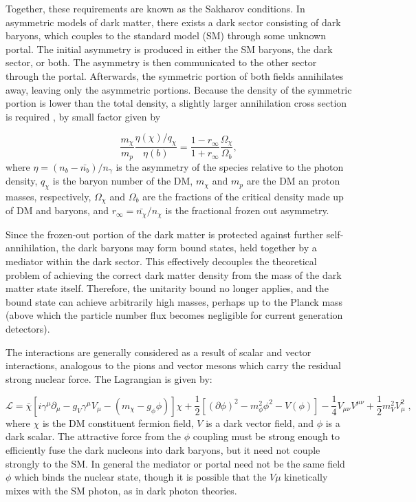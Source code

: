 Together, these requirements are known as the Sakharov conditions\cite{sakharov_violation_1967}. 
In asymmetric models of dark matter, there exists a dark sector consisting of dark baryons, which couples to the standard model (SM) through some unknown portal.
The initial asymmetry is produced in either the SM baryons, the dark sector, or both.
The asymmetry is then communicated to the other sector through the portal.
Afterwards, the symmetric portion of both fields annihilates away, leaving only the asymmetric portions.
Because the density of the symmetric portion is lower than the total density, a slightly larger annihilation cross section is required \cite{petraki_review_2013}, by small factor given by

\begin{equation}
    \frac{m_{\chi}}{m_p} \frac{\eta(\chi)/q_\chi}{\eta(b)} = \frac{1-r_\infty}{1+r_\infty}\frac{\Omega_\chi}{\Omega_b},
\end{equation}
\noindent
 where $\eta = (n_b -\bar{n_b})/n_\gamma$ is the asymmetry of the species relative to the photon density, $q_\chi$ is the baryon number of the DM, $m_\chi$ and $m_p$ are the DM an proton masses, respectively, $\Omega_\chi$ and $\Omega_b$ are the fractions of the critical density made up of DM and baryons, and $r_\infty = \bar{n_\chi} / n_\chi$ is the fractional frozen out asymmetry. 

Since the frozen-out portion of the dark matter is protected against further self-annihilation, the dark baryons may form bound states, held together by a mediator within the dark sector.
This effectively decouples the theoretical problem of achieving the correct dark matter density from the mass of the dark matter state itself.
Therefore, the unitarity bound no longer applies, and the bound state can achieve arbitrarily high masses, perhaps up to the Planck mass (above which the particle number flux becomes negligible for current generation detectors).

The interactions are generally considered as a result of scalar and vector interactions, analogous to  the pions and vector mesons which carry the residual strong nuclear force.
The Lagrangian is given by\cite{gresham_nuclear_2017}:

\begin{equation}
    \mathcal{L} = \bar \chi [i \gamma^\mu \partial_\mu - g_V \gamma^\mu V_\mu - (m_\chi - g_\phi \phi)] \chi + \frac{1}{2}[(\partial \phi )^2 - m_\phi^2 \phi^2 - V(\phi)] - \frac{1}{4} V_{\mu \nu} V^{\mu \nu} + \frac{1}{2} m_V^2 V_\mu^2\;,
    \label{eq:blobs_lagrangian}
\end{equation}
\noindent
where $\chi$ is the DM constituent fermion field, $V$ is a dark vector field, and $\phi$ is a dark scalar.
The attractive force from the $\phi$ coupling must be strong enough to efficiently fuse the dark nucleons into dark baryons, but it need not couple strongly to the SM.
In general the mediator or portal need not be the same field $\phi$ which binds the nuclear state\cite{coskuner_direct_2019}, though it is possible that the $V\mu$ kinetically mixes with the SM photon, as in dark photon theories\cite{essig_dark_2013}.

